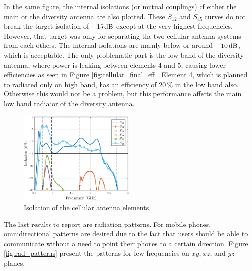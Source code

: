 In the same figure, the internal isolations (or mutual couplings) of either the main or the diversity antenna are also plotted. These $S_{12}$ and $S_{45}$ curves do not break the target isolation of $-15\,\mathrm{dB}$ except at the very highest frequencies. However, that target was only for separating the two cellular antenna systems from each others. The internal isolations are mainly below or around $-10\,\mathrm{dB}$, which is acceptable. The only problematic part is the low band of the diversity antenna, where power is leaking between elements 4 and 5, causing lower efficiencies as seen in Figure \ref{fig:cellular_final_eff}. Element 4, which is planned to radiated only on high band, has an efficiency of $20\,\%$ in the low band also. Otherwise this would not be a problem, but this performance affects the main low band radiator of the diversity antenna.
\begin{figure}[H]
    \centering
    \includegraphics[width=0.5\textwidth]{img/isolation_match_wgps.eps}
    \caption{Isolation of the cellular antenna elements.}
    \label{fig:isolation}
\end{figure}

The last results to report are radiation patterns. For mobile phones, omnidirectional patterns are desired due to the fact that users should be able to communicate without a need to point their phones to a certain direction. Figure \ref{fig:rad_patterns} present the patterns for few frequencies on $xy$, $xz$, and $yz$-planes.

